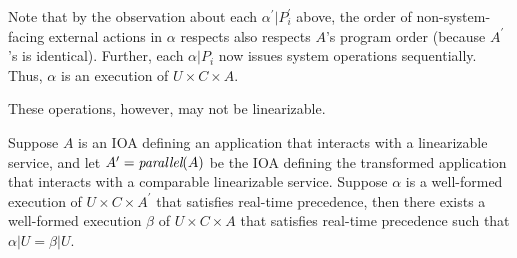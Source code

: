 Note that by the observation about each $\alpha^\prime | P_i^\prime$ above, the order of non-system-facing
external actions in $\alpha$ respects also respects $A$'s program order (because $A^\prime$'s is identical).
Further, each $\alpha | P_i$ now issues system operations sequentially. Thus, $\alpha$ is an execution of
$U \times C \times A$.

These operations, however,
may not be linearizable.

\begin{theorem}
  Suppose $A$ is an IOA defining an application that interacts with a linearizable service,
  and let $A^\prime = \operatorname*{\textit{parallel}}(A)$ be the IOA defining the transformed application that
  interacts with a comparable \multidispatch{} linearizable service. Suppose $\alpha$ is a
  well-formed execution of $U \times C \times A^\prime$ that satisfies \multidispatch{} real-time
  precedence, then there exists a well-formed execution $\beta$ of $U \times C \times A$ that
  satisfies \singledispatch{} real-time precedence such that $\alpha | U = \beta | U$.
\end{theorem}

